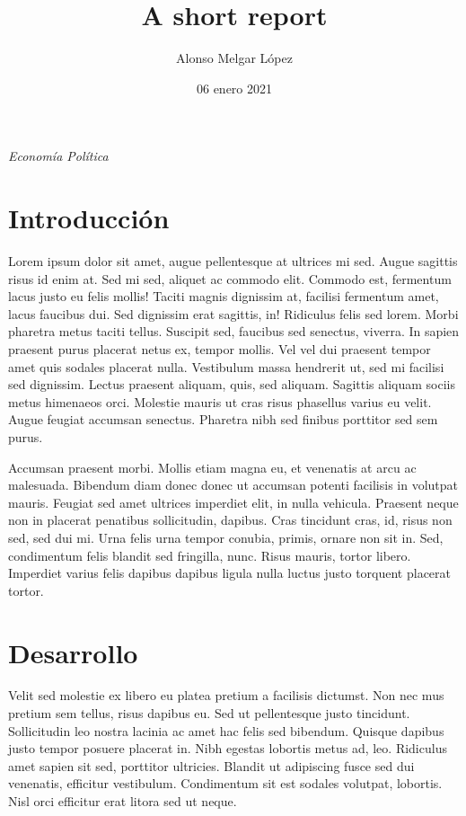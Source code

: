 \documentclass[spanish,]{article}
\title{A short report}
\author{Alonso Melgar López}
\date{06 enero 2021}
\makeatletter
\renewcommand{\maketitle}{\bgroup\vspace*{-1cm}\setlength{\parindent}{0pt}
\begin{flushleft}
  \textbf{\@title}

    \emph{Economía Política}
  
  \@date

\end{flushleft}\egroup
}
\makeatother
\begin{document}
\maketitle

\hypertarget{introducciuxf3n}{%
\section{Introducción}\label{introducciuxf3n}}

Lorem ipsum dolor sit amet, augue pellentesque at ultrices mi sed. Augue sagittis risus id enim at. Sed mi sed, aliquet ac commodo elit. Commodo est, fermentum lacus justo eu felis mollis! Taciti magnis dignissim at, facilisi fermentum amet, lacus faucibus dui. Sed dignissim erat sagittis, in! Ridiculus felis sed lorem. Morbi pharetra metus taciti tellus. Suscipit sed, faucibus sed senectus, viverra. In sapien praesent purus placerat netus ex, tempor mollis. Vel vel dui praesent tempor amet quis sodales placerat nulla. Vestibulum massa hendrerit ut, sed mi facilisi sed dignissim. Lectus praesent aliquam, quis, sed aliquam. Sagittis aliquam sociis metus himenaeos orci. Molestie mauris ut cras risus phasellus varius eu velit. Augue feugiat accumsan senectus. Pharetra nibh sed finibus porttitor sed sem purus.

Accumsan praesent morbi. Mollis etiam magna eu, et venenatis at arcu ac malesuada. Bibendum diam donec donec ut accumsan potenti facilisis in volutpat mauris. Feugiat sed amet ultrices imperdiet elit, in nulla vehicula. Praesent neque non in placerat penatibus sollicitudin, dapibus. Cras tincidunt cras, id, risus non sed, sed dui mi. Urna felis urna tempor conubia, primis, ornare non sit in. Sed, condimentum felis blandit sed fringilla, nunc. Risus mauris, tortor libero. Imperdiet varius felis dapibus dapibus ligula nulla luctus justo torquent placerat tortor.

\hypertarget{desarrollo}{%
\section{Desarrollo}\label{desarrollo}}

Velit sed molestie ex libero eu platea pretium a facilisis dictumst. Non nec mus pretium sem tellus, risus dapibus eu. Sed ut pellentesque justo tincidunt. Sollicitudin leo nostra lacinia ac amet hac felis sed bibendum. Quisque dapibus justo tempor posuere placerat in. Nibh egestas lobortis metus ad, leo. Ridiculus amet sapien sit sed, porttitor ultricies. Blandit ut adipiscing fusce sed dui venenatis, efficitur vestibulum. Condimentum sit est sodales volutpat, lobortis. Nisl orci efficitur erat litora sed ut neque.
\end{document}
